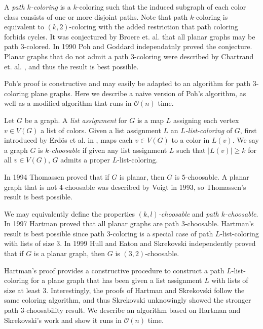\documentclass[letterpaper, 12pt]{article}
\theoremstyle{definition}
\theoremstyle{definition}
\theoremstyle{thm}
\theoremstyle{definition}
\begin{document}
A \textit{path $k$-coloring} is a
$k$-coloring such that the induced subgraph of each color class consists of one
or more disjoint paths. Note that path $k$-coloring is equivalent to
$(k,2)$-coloring with the added restriction that path coloring forbids cycles.
It was conjectured by Broere et. al. \cite{broere} that all planar graphs may
be path $3$-colored. In 1990 Poh \cite{poh} and Goddard \cite{goddard}
independatnly proved the conjecture. Planar graphs that do not admit a path $3$-coloring
were described by Chartrand et. al. \cite{kronk}, and thus the result is best possible.

Poh's proof is constructive and may easily be adapted to an algorithm for path
$3$-coloring plane graphs. Here we describe a naive version of Poh's algorithm,
as well as a modified algorithm that runs in $\mathcal{O}(n)$ time.

Let $G$ be a graph. A \textit{list assignment} for $G$ is a map $L$ assigning
each vertex $v\in V(G)$ a list of colors. Given a list assignment $L$ an
\textit{$L$-list-coloring} of $G$, first introduced
by Erd{\"o}s et al. in \cite{erdos}, maps each $v\in V(G)$ to a color in $L(v)$.
We say a graph $G$ is \textit{$k$-choosable} if given any list assignment $L$ such that
$|L(v)|\ge k$ for all $v\in V(G)$, $G$ admits a proper $L$-list-coloring.

In 1994 Thomassen \cite{thomassen} proved that if $G$ is planar, then $G$ is
$5$-choosable. A planar graph that is not $4$-choosable was
described by Voigt \cite{voigt} in 1993, so Thomassen's result is best possible.

We may equivalently define the properties \textit{$(k,l)$-choosable} and
\textit{path $k$-choosable}. In 1997 Hartman \cite{hartman} proved that all
planar graphs are path $3$-choosable. Hartman's result is best possible since
path $3$-coloring is a special case of path $L$-list-coloring with lists of size
$3$. In 1999 Hull and Eaton \cite{hull} and Skrekovski \cite{skrekovski}
independently proved that if $G$ is a planar graph, then $G$ is
$(3,2)$-choosable.

Hartman's proof provides a constructive procedure to construct a path
$L$-list-coloring for a plane graph that has been given a list assignment $L$
with lists of size at least $3$. Interestingly, the proofs of Hartman and
Skrekovski follow the same coloring algorithm, and thus Skrekovski unknowingly
showed the stronger path $3$-choosability result. We describe an algorithm
based on Hartman and Skrekovski's work and show it runs in $\mathcal{O}(n)$
time.
\end{document}
